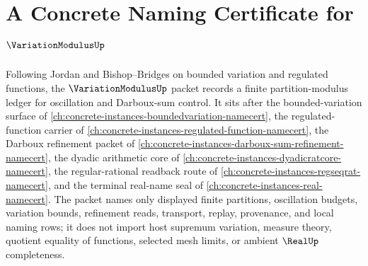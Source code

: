 \chapter{A Concrete Naming Certificate for $\VariationModulusUp$}
\label{ch:concrete-instances-variation-modulus-namecert}

Following Jordan and Bishop--Bridges on bounded variation and regulated functions, the $\VariationModulusUp$ packet records a finite partition-modulus ledger for oscillation and Darboux-sum control. It sits after the bounded-variation surface of \autoref{ch:concrete-instances-boundedvariation-namecert}, the regulated-function carrier of \autoref{ch:concrete-instances-regulated-function-namecert}, the Darboux refinement packet of \autoref{ch:concrete-instances-darboux-sum-refinement-namecert}, the dyadic arithmetic core of \autoref{ch:concrete-instances-dyadicratcore-namecert}, the regular-rational readback route of \autoref{ch:concrete-instances-regseqrat-namecert}, and the terminal real-name seal of \autoref{ch:concrete-instances-real-namecert}. The packet names only displayed finite partitions, oscillation budgets, variation bounds, refinement reads, transport, replay, provenance, and local naming rows; it does not import host supremum variation, measure theory, quotient equality of functions, selected mesh limits, or ambient $\RealUp$ completeness.

